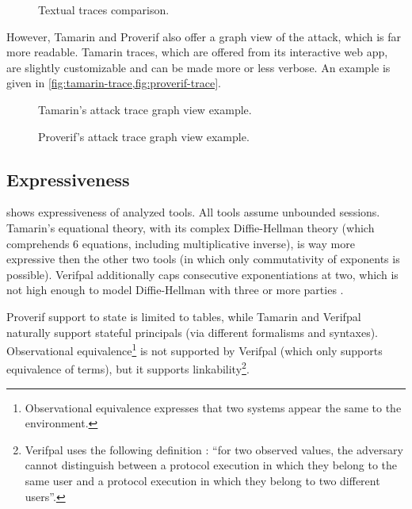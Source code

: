 \begin{figure}[t]
    \centering
    \caption{Textual traces comparison.}
    \label{fig:attack-trace}
\end{figure}

However, Tamarin and Proverif also offer a graph view of the attack, which is far more readable. Tamarin traces, which are offered from its interactive web app, are slightly customizable and can be made more or less verbose. An example is given in \cref{fig:tamarin-trace,fig:proverif-trace}.


\begin{figure}[t]
    \centering
    \caption{Tamarin's attack trace graph view example.}
    \label{fig:tamarin-trace}
\end{figure}
\begin{figure}[t]
    \centering
    \caption{Proverif's attack trace graph view example.}
    \label{fig:proverif-trace}
\end{figure}


\subsection{Expressiveness}
 shows expressiveness of analyzed tools.
All tools assume unbounded sessions. Tamarin's equational theory, with its complex Diffie-Hellman theory (which comprehends 6 equations, including multiplicative inverse), is way more expressive then the other two tools (in which only commutativity of exponents is possible). Verifpal additionally caps consecutive exponentiations at two, which is not high enough to model Diffie-Hellman with three or more parties \cite{MultipartyDH}.

Proverif support to state is limited to tables, while Tamarin and Verifpal naturally support stateful principals (via different formalisms and syntaxes). Observational equivalence\footnote{Observational equivalence expresses that two systems appear the same to the environment.} is not supported by Verifpal (which only supports equivalence of terms), but it supports linkability\footnote{Verifpal uses the following definition \cite{VerifpalFoundations}: ``for two
    observed values, the adversary cannot distinguish between a protocol execution in
    which they belong to the same user and a protocol execution in which they belong to
    two different users''.}.

